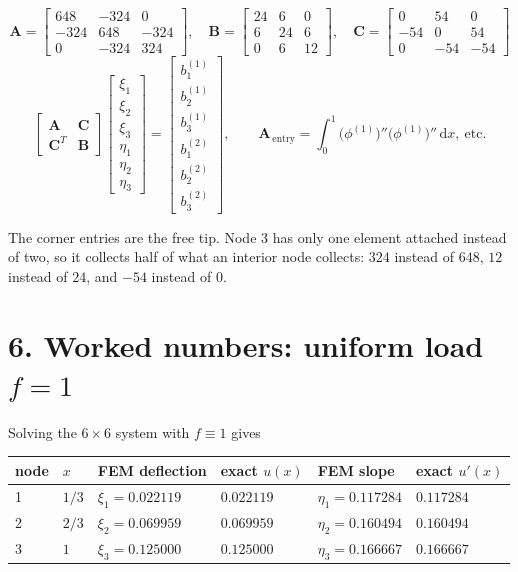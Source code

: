 \documentclass[11pt]{article}
\newcommand{\dx}{\,\mathrm{d}x}
\begin{document}
\[
  \boldsymbol{A}=\begin{bmatrix}648&-324&0\\-324&648&-324\\0&-324&\boxed{324}\end{bmatrix},\quad
  \boldsymbol{B}=\begin{bmatrix}24&6&0\\6&24&6\\0&6&\boxed{12}\end{bmatrix},\quad
  \boldsymbol{C}=\begin{bmatrix}0&54&0\\-54&0&54\\0&-54&\boxed{-54}\end{bmatrix}
\]
\[
  \begin{bmatrix}\boldsymbol{A}&\boldsymbol{C}\\[2pt]\boldsymbol{C}^{T}&\boldsymbol{B}\end{bmatrix}
  \begin{bmatrix}\xi_{1}\\\xi_{2}\\\xi_{3}\\\eta_{1}\\\eta_{2}\\\eta_{3}\end{bmatrix}
  =\begin{bmatrix}b^{(1)}_{1}\\b^{(1)}_{2}\\b^{(1)}_{3}\\b^{(2)}_{1}\\b^{(2)}_{2}\\b^{(2)}_{3}\end{bmatrix},
  \qquad
  \boldsymbol{A}_{\,\text{entry}}=\int_{0}^{1}\bigl(\phi^{(1)}\bigr)''\bigl(\phi^{(1)}\bigr)''\dx,\ \text{etc.}
\]

The  corner entries are the free tip.  Node 3 has only one
element attached instead of two, so it collects half of what an interior node
collects: $324$ instead of $648$, $12$ instead of $24$, and $-54$ instead of
$0$.

\section*{6. Worked numbers: uniform load $f=1$}

Solving the $6\times6$ system with $f\equiv1$ gives

\begin{center}\small
\renewcommand{\arraystretch}{1.3}
\begin{tabular}{@{}llllll@{}}
\toprule
node & $x$ & FEM deflection & exact $u(x)$ & FEM slope & exact $u'(x)$\\
\midrule
1 & $1/3$ & $\xi_{1}=0.022119$ & $0.022119$ & $\eta_{1}=0.117284$ & $0.117284$\\
2 & $2/3$ & $\xi_{2}=0.069959$ & $0.069959$ & $\eta_{2}=0.160494$ & $0.160494$\\
3 & $1$   & $\xi_{3}=0.125000$ & $0.125000$ & $\eta_{3}=0.166667$ & $0.166667$\\
\bottomrule
\end{tabular}
\end{center}
\end{document}
